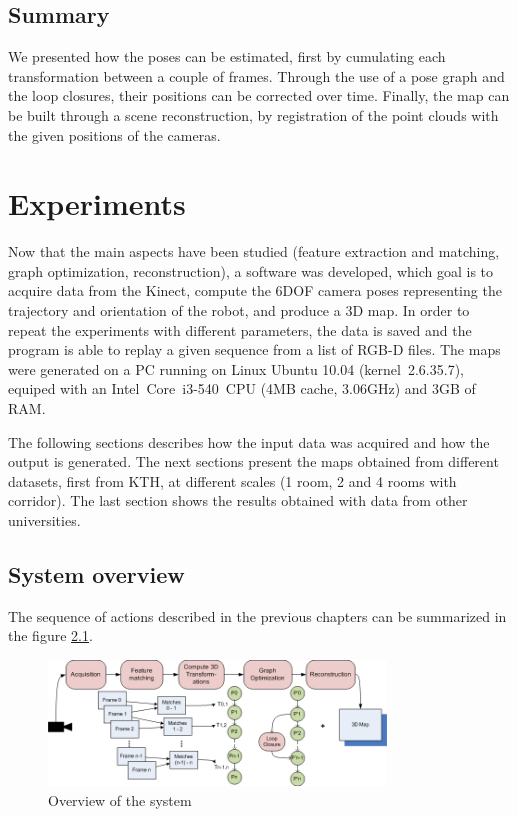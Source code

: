 \section{Summary}

We presented how the poses can be estimated, first by cumulating each transformation between a couple of frames. Through the use of a pose graph and the loop closures, their positions can be corrected over time. Finally, the map can be built through a scene reconstruction, by registration of the point clouds with the given positions of the cameras.

\chapter{Experiments}
\label{chap:experiments}

Now that the main aspects have been studied (feature extraction and matching, graph optimization, reconstruction), a software was developed, which goal is to acquire data from the Kinect, compute the 6DOF camera poses representing the trajectory and orientation of the robot, and produce a 3D map. In order to repeat the experiments with different parameters, the data is saved and the program is able to replay a given sequence from a list of RGB-D files. The maps were generated on a PC running on Linux Ubuntu 10.04 (kernel~2.6.35.7), equiped with an Intel~Core\texttrademark{}~i3-540~CPU (4MB cache, 3.06GHz) and 3GB of RAM.

The following sections describes how the input data was acquired and how the output is generated. The next sections present the maps obtained from different datasets, first from KTH, at different scales (1 room, 2 and 4 rooms with corridor). The last section shows the results obtained with data from other universities.

\section{System overview}

The sequence of actions described in the previous chapters can be summarized in the figure \ref{fig:system_overview}.

\begin{figure}[h!]
\begin{center}
\includegraphics[width=0.8\textwidth]{figures/overview}
\caption{Overview of the system}
\label{fig:system_overview}
\end{center}
\end{figure}

